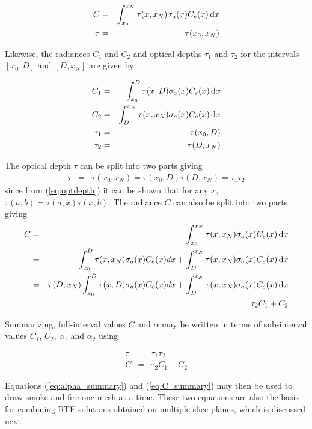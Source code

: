 {\begin{eqnarray}
C&=&\int_{x_0}^{x_N}\tau(x,x_N)\sigma_a(x)C_e(x)\,\mbox{d}x\\
\tau&=&\tau(x_0,x_N)
\end{eqnarray}

Likewise, the radiances $C_1$ and $C_2$ and optical depths $\tau_1$ and $\tau_2$ for the intervals $[x_0,D]$ and $[D,x_N]$ are given by

\begin{eqnarray}
C_1&=&\int_{x_0}^{D}\tau(x,D)\sigma_a(x)C_e(x)\,\mbox{d}x\\
C_2&=&\int_{D}^{x_N}\tau(x,x_N)\sigma_a(x)C_e(x)\,\mbox{d}x\\
\tau_1&=&\tau(x_0,D)\\
\tau_2&=&\tau(D,x_N)
\end{eqnarray}

The optical depth $\tau$ can be split into two parts giving
\begin{eqnarray}
\tau&=&\tau(x_0,x_N)=\tau(x_0,D)\tau(D,x_N)=\tau_1\tau_2
\end{eqnarray}
since from (\ref{eq:optdepth}) it can be shown that for any $x$, $\tau(a,b)=\tau(a,x)\tau(x,b)$.
The radiance $C$ can also be split into two parts giving
\begin{eqnarray}
C&=&\int_{x_0}^{x_N}\tau(x,x_N)\sigma_a(x)C_e(x)\,\mbox{d}x\\
&=&\int_{x_0}^{D}\tau(x,x_N)\sigma_a(x)C_e(x)dx+\int_{D}^{x_N}\tau(x,x_N)\sigma_a(x)C_e(x)\,\mbox{d}x\\
&=&\tau(D,x_N)\int_{x_0}^{D}\tau(x,D)\sigma_a(x)C_e(x)dx+\int_{D}^{x_N}\tau(x,x_N)\sigma_a(x)C_e(x)\,\mbox{d}x\\
&=&\tau_2C_1+C_2
\end{eqnarray}

Summarizing, full-interval values $C$ and $\alpha$ may be written in terms of sub-interval values $C_1$, $C_2$, $\alpha_1$ and $\alpha_2$ using

\begin{eqnarray}
\label{eq:alpha_summary}
\tau&=&\tau_1\tau_2\\
\label{eq:C_summary}
C&=&\tau_2C_1+C_2
\end{eqnarray}

Equations (\ref{eq:alpha_summary}) and (\ref{eq:C_summary}) may then be used to draw smoke and fire one mesh at a time.  These two equations are also the basis for combining RTE solutions obtained on multiple slice planes, which is discussed next.


}
